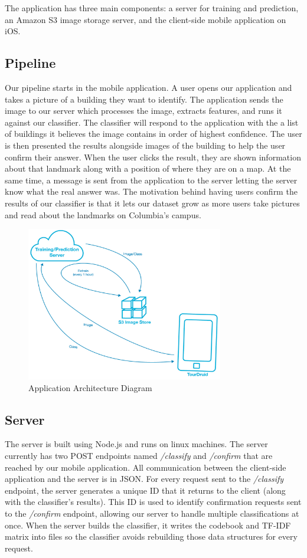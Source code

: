 The application has three main components: a server for training and prediction, an Amazon S3 image storage server, and the client-side mobile application on iOS. 

\subsection{Pipeline}
Our pipeline starts in the mobile application. A user opens our application and takes a picture of a building they want to identify. The application sends the image to our server which processes the image, extracts features, and runs it against our classifier. The classifier will respond to the application with the a list of buildings it believes the image contains in order of highest confidence. The user is then presented the results alongside images of the building to help the user confirm their answer. When the user clicks the result, they are shown information about that landmark along with a position of where they are on a map. At the same time, a message is sent from the application to the server letting the server know what the real answer was. The motivation behind having users confirm the results of our classifier is that it lets our dataset grow as more users take pictures and read about the landmarks on Columbia's campus.

\begin{figure}
\includegraphics[width=86mm]{app_arch.png}

\caption{Application Architecture Diagram}
\label{overflow}

\end{figure}

\subsection{Server}
The server is built using Node.js and runs on linux machines. The server currently has two POST endpoints named \textit{/classify} and \textit{/confirm} that are reached by our mobile application. All communication between the client-side application and the server is in JSON. For every request sent to the \textit{/classify} endpoint, the server generates a unique ID that it returns to the client (along with the classifier's results). This ID is used to identify confirmation requests sent to the \textit{/confirm} endpoint, allowing our server to handle multiple classifications at once. When the server builds the classifier, it writes the codebook and TF-IDF matrix into files so the classifier avoids rebuilding those data structures for every request.


